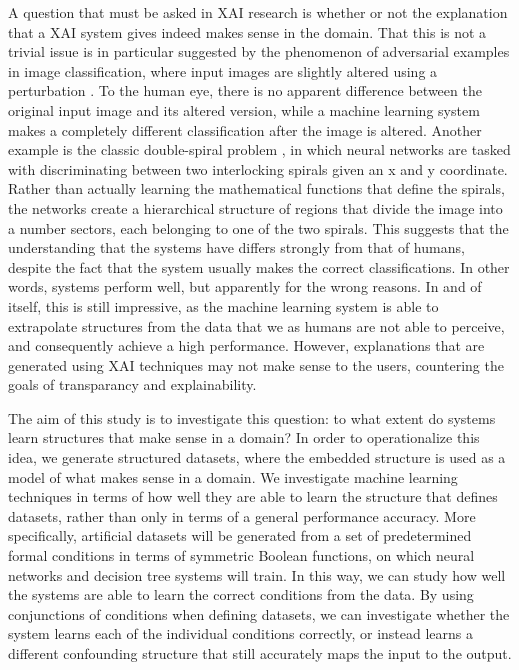 \documentclass[letterpaper]{article} %
\begin{document}
A question that must be asked in XAI research is whether or not the explanation that a XAI system gives indeed makes sense in the domain. That this is not a trivial issue is in particular suggested by the phenomenon of adversarial examples in image classification, where input images are slightly altered using a perturbation \cite{yuan2017adversarial}. To the human eye, there is no apparent difference between the original input image and its altered version, while a machine learning system makes a completely different classification after the image is altered. Another example is the classic double-spiral problem \cite{Kaufmann1989Learning}, in which neural networks are tasked with discriminating between two interlocking spirals given an x and y coordinate. Rather than actually learning the mathematical functions that define the spirals, the networks create a hierarchical structure of regions that divide the image into a number sectors, each belonging to one of the two spirals. This suggests that the understanding that the systems have differs strongly from that of humans, despite the fact that the system usually makes the correct classifications. In other words, systems perform well, but apparently for the wrong reasons. In and of itself, this is still impressive, as the machine learning system is able to extrapolate structures from the data that we as humans are not able to perceive, and consequently achieve a high performance. However, explanations that are generated using XAI techniques may not make sense to the users, countering the goals of transparancy and explainability. 

The aim of this study is to investigate this question: to what extent do systems learn structures that make sense in a domain? In order to operationalize this idea, we generate structured datasets, where the embedded structure is used as a model of what makes sense in a domain. We investigate machine learning techniques in terms of how well they are able to learn the structure that defines datasets, rather than only in terms of a general performance accuracy. More specifically, artificial datasets will be generated from a set of predetermined formal conditions in terms of symmetric Boolean functions, on which neural networks and decision tree systems will train. In this way, we can study how well the systems are able to learn the correct conditions from the data. 
By using conjunctions of conditions when defining datasets, 
we can investigate whether the system learns each of the individual conditions correctly, or instead learns a different confounding structure that still accurately maps the input to the output. 
\end{document}
